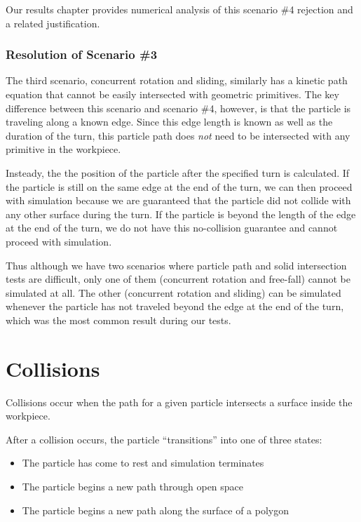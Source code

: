Our results chapter provides numerical analysis of this scenario \#4 rejection and a related justification.

		\subsubsection{Resolution of Scenario \#3}

The third scenario, concurrent rotation and sliding, similarly has a kinetic path equation that cannot be easily intersected with geometric primitives. The key difference between this scenario and scenario \#4, however, is that the particle is traveling along a known edge. Since this edge length is known as well as the duration of the turn, this particle path does \emph{not} need to be intersected with any primitive in the workpiece.

Insteady, the the position of the particle after the specified turn is calculated. If the particle is still on the same edge at the end of the turn, we can then proceed with simulation because we are guaranteed that the particle did not collide with any other surface during the turn. If the particle is beyond the length of the edge at the end of the turn, we do not have this no-collision guarantee and cannot proceed with simulation.

Thus although we have two scenarios where particle path and solid intersection tests are difficult, only one of them (concurrent rotation and free-fall) cannot be simulated at all. The other (concurrent rotation and sliding) can be simulated whenever the particle has not traveled beyond the edge at the end of the turn, which was the most common result during our tests.

	\section{Collisions}

Collisions occur when the path for a given particle intersects a surface inside the workpiece.


After a collision occurs, the particle ``transitions'' into one of three states:

\begin{itemize}
\item The particle has come to rest and simulation terminates
\item The particle begins a new path through open space
\item The particle begins a new path along the surface of a polygon
\end{itemize}


